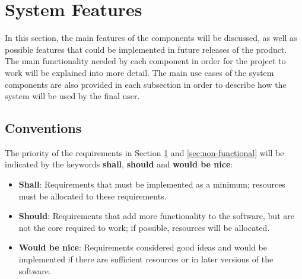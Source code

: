 \section{System Features}
\label{sec:system-features}

In this section, the main features of the components will be discussed, as well as possible features that could be implemented in future releases of the product.
The main functionality needed by each component in order for the project to work will be explained into more detail. \newline
The main use cases of the system components are also provided in each subsection in order to describe how the system will be used by the final user. 

\subsection{Conventions}

The priority of the requirements in Section \ref{sec:system-features} and \ref{sec:non-functional} will be indicated by the keywords \textbf{shall}, \textbf{should} and \textbf{would be nice}:

\begin{itemize}
	\item \textbf{Shall}: Requirements that must be implemented as a minimum; resources must be allocated to these requirements.
	\item \textbf{Should}: Requirements that add more functionality to the software, but are not the core required to work; if possible, resources will be allocated.
	\item \textbf{Would be nice}: Requirements considered good ideas and would be implemented if there are sufficient resources or in later versions of the software.
\end{itemize}






